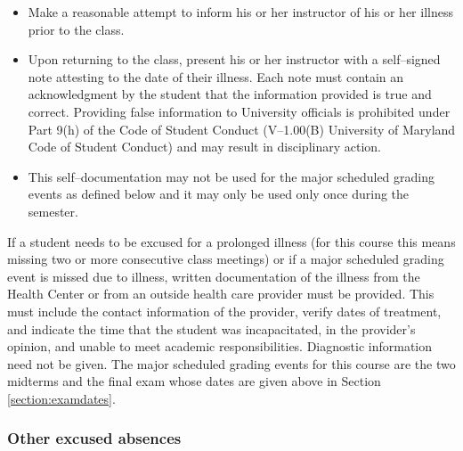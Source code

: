 \documentclass[10pt]{article}
\begin{document}
        \begin{itemize}

          \addtolength{\itemsep}{-1.25mm}

          \item Make a reasonable attempt to inform his or her instructor of
                his or her illness prior to the class.

          \item Upon returning to the class, present his or her instructor
                with a self--signed note attesting to the date of their
                illness.  Each note must contain an acknowledgment by the
                student that the information provided is true and correct.
                Providing false information to University officials is
                prohibited under Part 9(h) of the Code of Student Conduct
                (V--1.00(B) University of Maryland Code of Student Conduct)
                and may result in disciplinary action.

          \item This self--documentation may not be used for the major
                scheduled grading events as defined below and it may only be
                used only once during the semester.

        \end{itemize}

        \vspace{-1.5mm}

          If a student needs to be excused for a prolonged illness (for this
        course this means missing two or more consecutive class meetings) or
        if a major scheduled grading event is missed due to illness, written
        documentation of the illness from the Health Center or from an
        outside health care provider must be provided.  This must include
        the contact information of the provider, verify dates of treatment,
        and indicate the time that the student was incapacitated, in the
        provider's opinion, and unable to meet academic responsibilities.
        Diagnostic information need not be given.  The major scheduled
        grading events for this course are the two midterms and the final
        exam whose dates are given above in Section \ref{section:examdates}.

      \subsubsection{Other excused absences}
\end{document}
